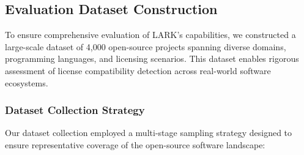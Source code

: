 \subsection{Evaluation Dataset Construction}
\label{sec:evaluation_dataset}

To ensure comprehensive evaluation of LARK's capabilities, we constructed a large-scale dataset of 4,000 open-source projects spanning diverse domains, programming languages, and licensing scenarios. This dataset enables rigorous assessment of license compatibility detection across real-world software ecosystems.

\subsubsection{Dataset Collection Strategy}
Our dataset collection employed a multi-stage sampling strategy designed to ensure representative coverage of the open-source software landscape:

